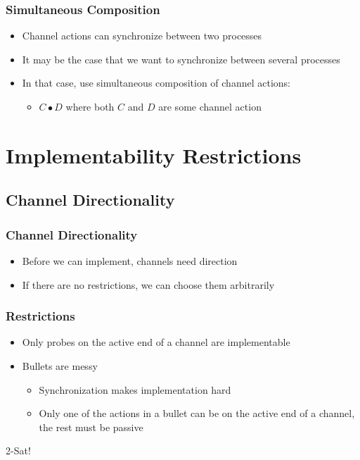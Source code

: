 \documentclass[compress]{beamer}
\begin{document}
\begin{frame}
\frametitle{Simultaneous Composition}
\begin{itemize}
\item Channel actions can synchronize between two processes
\item It may be the case that we want to synchronize between several processes
\item In that case, use simultaneous composition of channel actions:
\begin{itemize}
\item $C \bullet D$ where both $C$ and $D$ are some channel action
\end{itemize}
\end{itemize}
\end{frame}
\section{Implementability Restrictions}
\subsection{Channel Directionality}
\begin{frame}
\frametitle{Channel Directionality}
\pause
\begin{itemize}
    \item Before we can implement, channels need direction
    \pause
    \item If there are no restrictions, we can choose them arbitrarily
\end{itemize}
\end{frame}
\begin{frame}
\frametitle{Restrictions}
\pause
\begin{itemize}
    \item Only probes on the active end of a channel are implementable
    \pause
    \item Bullets are messy
    \pause
    \begin{itemize}
        \item Synchronization makes implementation hard
        \pause
        \item Only one of the actions in a bullet can be on the active end of a channel, the rest must be passive
    \end{itemize}
\end{itemize}
\end{frame}
\begin{frame}[plain]
\begin{center}
\huge 2-Sat!
\end{center}
\end{frame}
\end{document}
